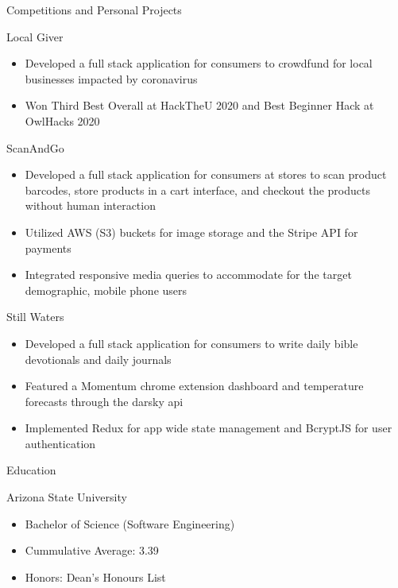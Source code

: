 \documentclass{article}
\newlength{\tabin}
\newlength{\secsep}
\newcommand{\lineunder}{\vspace*{-8pt} \\ \hspace*{-6pt} \hrulefill \\ \vspace*{-15pt}}
\newenvironment{tabbedsection}[1]{
  \begin{list}{}{
      \setlength{\itemsep}{0pt}
      \setlength{\labelsep}{0pt}
      \setlength{\labelwidth}{0pt}
      \setlength{\leftmargin}{\tabin}
      \setlength{\rightmargin}{\tabin}
      \setlength{\listparindent}{0pt}
      \setlength{\parsep}{0pt}
      \setlength{\parskip}{0pt}
      \setlength{\partopsep}{0pt}
      \setlength{\topsep}{#1}
    }
  \item[]
}{\end{list}}
\newenvironment{resume_section}[1]{
  \filbreak
  \vspace{2\secsep}
  \textsc{\large#1}
  \lineunder
  \begin{tabbedsection}{\secsep}
}{\end{tabbedsection}}
\newenvironment{resume_subsection}[2][]{
  \textbf{#2} \hfill {\footnotesize #1} \hspace{2em}
  \begin{tabbedsection}{0.5\secsep}
}{\end{tabbedsection}}
\newenvironment{subitems}{
  \renewcommand{\labelitemi}{-}
  \begin{itemize}
      \setlength{\labelsep}{1em}
}{\end{itemize}}
\begin{document}
\begin{resume_section}{Competitions and Personal Projects}
  \begin{resume_subsection}[(August 2020)]{Local Giver}
  \begin{subitems}
    \item Developed a full stack application for consumers to crowdfund for local businesses impacted by coronavirus
    \item Won Third Best Overall at HackTheU 2020 and Best Beginner Hack at OwlHacks 2020
    \end{subitems}
  \end{resume_subsection}


  \begin{resume_subsection}[(November 2020)]{ScanAndGo}
  \begin{subitems}
    \item Developed a full stack application for consumers at stores to scan product barcodes, store products in a cart interface, and checkout the products without human interaction
    \item Utilized AWS (S3) buckets for image storage and the Stripe API for payments
    \item  Integrated responsive media queries to accommodate for the target demographic, mobile phone users
    \end{subitems}
  \end{resume_subsection}



  \begin{resume_subsection}[(September 2020)]{Still Waters}
    \begin{subitems}
        \item Developed a full stack application for consumers to write daily bible devotionals and daily journals
        \item Featured a Momentum chrome extension dashboard and temperature forecasts through the darsky api 
        \item Implemented Redux for app wide state management and BcryptJS for user authentication
    \end{subitems}
  \end{resume_subsection}


\begin{resume_section}{Education}
  \begin{resume_subsection}{Arizona State University}
    \begin{subitems}
      \item Bachelor of Science (Software Engineering)
      \item Cummulative Average: 3.39
      \item Honors: Dean's Honours List
    \end{subitems}
  \end{resume_subsection}
  

\end{resume_section}
\end{resume_section}
\end{document}

